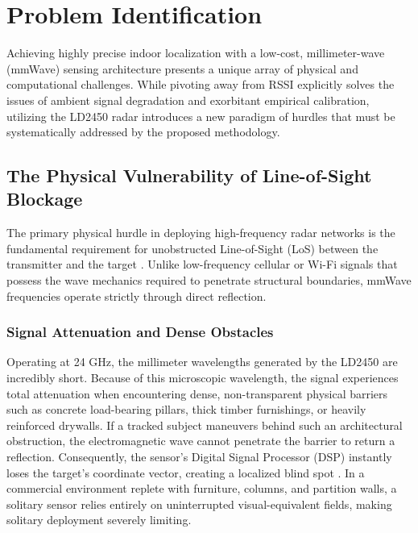 \chapter{Problem Identification}
\label{Problem_Identification}

Achieving highly precise indoor localization with a low-cost, millimeter-wave (mmWave) sensing architecture presents a unique array of physical and computational challenges. While pivoting away from RSSI explicitly solves the issues of ambient signal degradation and exorbitant empirical calibration, utilizing the LD2450 radar introduces a new paradigm of hurdles that must be systematically addressed by the proposed methodology.

\section{The Physical Vulnerability of Line-of-Sight Blockage}
The primary physical hurdle in deploying high-frequency radar networks is the fundamental requirement for unobstructed Line-of-Sight (LoS) between the transmitter and the target \cite{rappaport2013millimeter}. Unlike low-frequency cellular or Wi-Fi signals that possess the wave mechanics required to penetrate structural boundaries, mmWave frequencies operate strictly through direct reflection.

\subsection{Signal Attenuation and Dense Obstacles}
Operating at 24 GHz, the millimeter wavelengths generated by the LD2450 are incredibly short. Because of this microscopic wavelength, the signal experiences total attenuation when encountering dense, non-transparent physical barriers such as concrete load-bearing pillars, thick timber furnishings, or heavily reinforced drywalls. If a tracked subject maneuvers behind such an architectural obstruction, the electromagnetic wave cannot penetrate the barrier to return a reflection. Consequently, the sensor's Digital Signal Processor (DSP) instantly loses the target's coordinate vector, creating a localized blind spot \cite{wei2014key}. In a commercial environment replete with furniture, columns, and partition walls, a solitary sensor relies entirely on uninterrupted visual-equivalent fields, making solitary deployment severely limiting.

